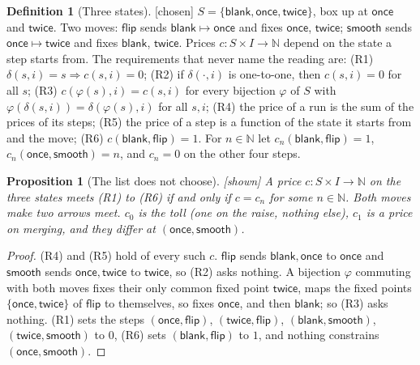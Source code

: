 \documentclass[11pt, a4paper]{article}
\theoremstyle{plain}
\newtheorem{proposition}[theorem]{Proposition}
\theoremstyle{definition}
\newtheorem{definition}[theorem]{Definition}
\theoremstyle{remark}
\newcommand{\N}{\mathbb{N}}
\newcommand{\step}{\delta}
\newcommand{\cost}{c}
\newcommand{\kind}[1]{\textup{[#1]}}
\begin{document}
\begin{definition}[Three states]\label{spec:three-states} \kind{chosen}
$S=\{\mathsf{blank},\mathsf{once},\mathsf{twice}\}$, box up at $\mathsf{once}$ and $\mathsf{twice}$. Two moves:
$\mathsf{flip}$ sends $\mathsf{blank}\mapsto\mathsf{once}$ and fixes $\mathsf{once}$, $\mathsf{twice}$;
$\mathsf{smooth}$ sends $\mathsf{once}\mapsto\mathsf{twice}$ and fixes $\mathsf{blank}$, $\mathsf{twice}$.
Prices $\cost:S\times I\to\N$ depend on the state a step starts from. The requirements that never name the
reading are:
(R1) $\step(s,i)=s\Rightarrow\cost(s,i)=0$;
(R2) if $\step(\cdot,i)$ is one-to-one, then $\cost(s,i)=0$ for all $s$;
(R3) $\cost(\varphi(s),i)=\cost(s,i)$ for every bijection $\varphi$ of $S$ with
$\varphi(\step(s,i))=\step(\varphi(s),i)$ for all $s,i$;
(R4) the price of a run is the sum of the prices of its steps;
(R5) the price of a step is a function of the state it starts from and the move;
(R6) $\cost(\mathsf{blank},\mathsf{flip})=1$.
For $n\in\N$ let $\cost_n(\mathsf{blank},\mathsf{flip})=1$, $\cost_n(\mathsf{once},\mathsf{smooth})=n$, and
$\cost_n=0$ on the other four steps.
\end{definition}

\begin{proposition}[The list does not choose]\label{spec:list-no-choice} \kind{shown}
A price $\cost:S\times I\to\N$ on the three states meets (R1) to (R6) if and only if $\cost=\cost_n$ for some
$n\in\N$. Both moves make two arrows meet. $\cost_0$ is the toll (one on the raise, nothing else), $\cost_1$ is
a price on merging, and they differ at $(\mathsf{once},\mathsf{smooth})$.
\end{proposition}

\begin{proof}
(R4) and (R5) hold of every such $\cost$. $\mathsf{flip}$ sends $\mathsf{blank},\mathsf{once}$ to
$\mathsf{once}$ and $\mathsf{smooth}$ sends $\mathsf{once},\mathsf{twice}$ to $\mathsf{twice}$, so (R2) asks
nothing. A bijection $\varphi$ commuting with both moves fixes their only common fixed point $\mathsf{twice}$,
maps the fixed points $\{\mathsf{once},\mathsf{twice}\}$ of $\mathsf{flip}$ to themselves, so fixes
$\mathsf{once}$, and then $\mathsf{blank}$; so (R3) asks nothing. (R1) sets the steps
$(\mathsf{once},\mathsf{flip})$, $(\mathsf{twice},\mathsf{flip})$, $(\mathsf{blank},\mathsf{smooth})$,
$(\mathsf{twice},\mathsf{smooth})$ to $0$, (R6) sets $(\mathsf{blank},\mathsf{flip})$ to $1$, and nothing
constrains $(\mathsf{once},\mathsf{smooth})$.
\end{proof}
\end{document}
